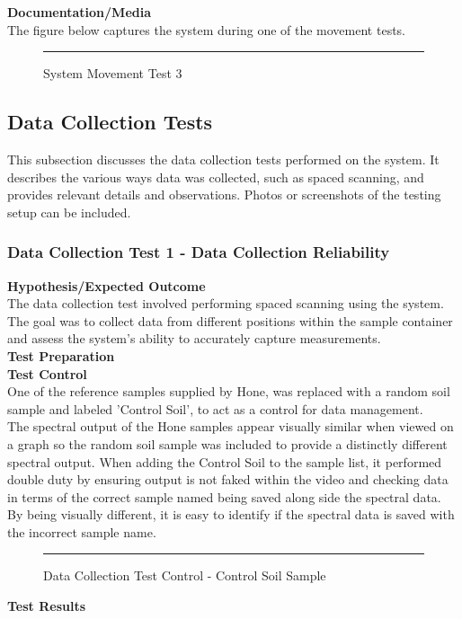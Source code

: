 \documentclass{UoNMCHA}
\numberwithin{equation}{section}
\begin{document}
\textbf{Documentation/Media}\\

The figure below captures the system during one of the movement tests.\\

\begin{figure}[h]
	\centering
	\rule{0.5\textwidth}{0.5\textwidth}%
	\caption{System Movement Test 3}
	\label{fig:System Movement Test 3}
\end{figure}

\subsection{Data Collection Tests}\label{sub:Data Collection Tests}
This subsection discusses the data collection tests performed on the system. It describes the various ways data was collected, such as spaced scanning, and provides relevant details and observations. Photos or screenshots of the testing setup can be included.\\

\subsubsection{Data Collection Test 1 - Data Collection Reliability}\label{subsub:Data Collection Test 1}
\textbf{Hypothesis/Expected Outcome}\\

The data collection test involved performing spaced scanning using the system. The goal was to collect data from different positions within the sample container and assess the system's ability to accurately capture measurements.\\
\textbf{Test Preparation}\\

\textbf{Test Control}\\

One of the reference samples supplied by Hone, was replaced with a random soil sample and labeled 'Control Soil', to act as a control for data management. \\
The spectral output of the Hone samples appear visually similar when viewed on a graph so the random soil sample was included to provide a distinctly different spectral output. When adding the Control Soil to the sample list, it performed double duty by ensuring output is not faked within the video and checking data in terms of the correct sample named being saved along side the spectral data. By being visually different, it is easy to identify if the spectral data is saved with the incorrect sample name. \\
\begin{figure}[h]
	\centering
	\rule{0.5\textwidth}{0.5\textwidth}%
	\caption{Data Collection Test Control - Control Soil Sample}
	\label{fig:Control Soil Sample}
\end{figure}
\textbf{Test Results}\\
\end{document}
